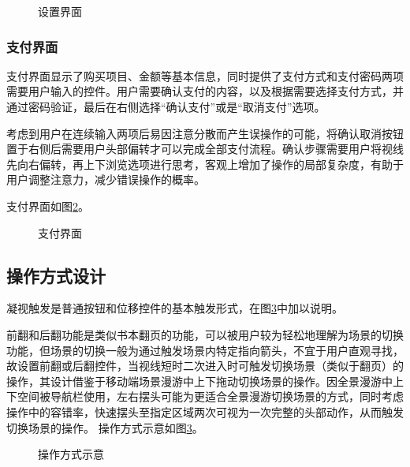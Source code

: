\begin{figure}[htp]
\centering
{}
\caption{设置界面}
\label{fig:d-05}
\end{figure}

\subsubsection{支付界面}
支付界面显示了购买项目、金额等基本信息，同时提供了支付方式和支付密码两项需要用户输入的控件。用户需要确认支付的内容，以及根据需要选择支付方式，并通过密码验证，最后在右侧选择“确认支付”或是“取消支付”选项。

考虑到用户在连续输入两项后易因注意分散而产生误操作的可能，将确认取消按钮置于右侧后需要用户头部偏转才可以完成全部支付流程。确认步骤需要用户将视线先向右偏转，再上下浏览选项进行思考，客观上增加了操作的局部复杂度，有助于用户调整注意力，减少错误操作的概率。

支付界面如图\ref{fig:d-12}。

\begin{figure}[htp]
\centering
{}
\caption{支付界面}
\label{fig:d-12}
\end{figure}

\subsection{操作方式设计}

凝视触发是普通按钮和位移控件的基本触发形式，在图\ref{fig:d-09}中加以说明。

前翻和后翻功能是类似书本翻页的功能，可以被用户较为轻松地理解为场景的切换功能，但场景的切换一般为通过触发场景内特定指向箭头，不宜于用户直观寻找，故设置前翻或后翻控件，当视线短时二次进入时可触发切换场景（类似于翻页）的操作，其设计借鉴于移动端场景漫游中上下拖动切换场景的操作。因全景漫游中上下空间被导航栏使用，左右摆头可能为更适合全景漫游切换场景的方式，同时考虑操作中的容错率，快速摆头至指定区域两次可视为一次完整的头部动作，从而触发切换场景的操作。
操作方式示意如图\ref{fig:d-09}。

\begin{figure}[htp]
\centering
{}
\caption{操作方式示意}
\label{fig:d-09}
\end{figure}